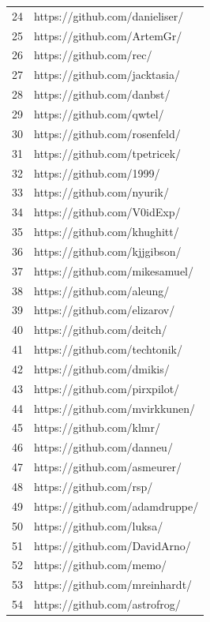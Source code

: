 \begin{center}
\begin{longtable}{|p{2cm}|p{7cm}|}
        24 & https://github.com/danieliser/ \\
        25 & https://github.com/ArtemGr/ \\
        26 & https://github.com/rec/ \\
        27 & https://github.com/jacktasia/ \\
        28 & https://github.com/danbst/ \\
        29 & https://github.com/qwtel/ \\
        30 & https://github.com/rosenfeld/ \\
        31 & https://github.com/tpetricek/ \\
        32 & https://github.com/1999/ \\
        33 & https://github.com/nyurik/ \\
        34 & https://github.com/V0idExp/ \\
        35 & https://github.com/khughitt/ \\
        36 & https://github.com/kjjgibson/ \\
        37 & https://github.com/mikesamuel/ \\
        38 & https://github.com/aleung/ \\
        39 & https://github.com/elizarov/ \\
        40 & https://github.com/deitch/ \\
        41 & https://github.com/techtonik/ \\
        42 & https://github.com/dmikis/ \\
        43 & https://github.com/pirxpilot/ \\
        44 & https://github.com/mvirkkunen/ \\
        45 & https://github.com/klmr/ \\
        46 & https://github.com/danneu/ \\
        47 & https://github.com/asmeurer/ \\
        48 & https://github.com/rsp/ \\
        49 & https://github.com/adamdruppe/ \\
        50 & https://github.com/luksa/ \\
        51 & https://github.com/DavidArno/ \\
        52 & https://github.com/memo/ \\
        53 & https://github.com/mreinhardt/ \\
        54 & https://github.com/astrofrog/ \\

\end{longtable}
\end{center}
